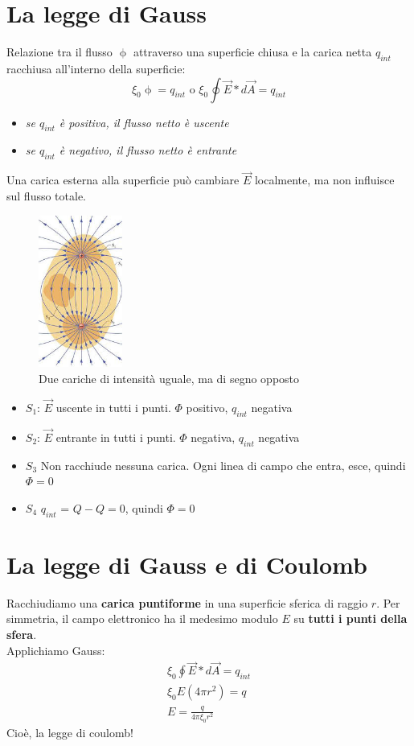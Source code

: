 \documentclass{book}
\begin{document}
\section{La legge di Gauss}
Relazione tra il flusso $\upphi$ attraverso una superficie chiusa e la carica netta $q_{int}$ racchiusa all'interno della superficie:
\begin{equation}
	\xi_0\upphi=q_{int} \text{ o } \xi_0\oint \vec{E}*d\vec{A}=q_{int}
\end{equation}
\begin{itemize}
\item \textit{se $q_{int}$ è positiva, il flusso netto è uscente}
\item \textit{se $q_{int}$ è negativo, il flusso netto è entrante}
\end{itemize}
Una carica esterna alla superficie può cambiare $\vec{E}$ localmente, ma non influisce sul flusso totale.
\begin{figure}[!h]
 	\centering
	\includegraphics[height=5cm]{img/cariche opposte.jpg}
    	\caption{Due cariche di intensità uguale, ma di segno opposto}
\end{figure}
\begin{itemize}
\item $S_1$: $\vec{E}$ uscente in tutti i punti. $\Phi$ positivo, $q_{int}$ negativa
\item $S_2$: $\vec{E}$ entrante in tutti i punti. $\Phi$ negativa, $q_{int}$ negativa
\item $S_3$ Non racchiude nessuna carica. Ogni linea di campo che entra, esce, quindi $\Phi = 0$
  \item $S_4$ $q_{int}$ = $Q-Q=0$, quindi $\Phi = 0$
\end{itemize}

\section{La legge di Gauss e di Coulomb}
Racchiudiamo una \textbf{carica puntiforme} in una superficie sferica di raggio $r$.
Per simmetria, il campo elettronico ha il medesimo modulo $E$ su \textbf{tutti i punti della sfera}.\\
Applichiamo Gauss:
\begin{eqnarray*}
  \xi_0\oint \vec{E}*d\vec{A}=q_{int}\\
  \xi_0 E(4\pi r^2) = q\\
  E=\frac{q}{4\pi\xi_0r^2}
\end{eqnarray*}
Cioè, la legge di coulomb!
\end{document}
